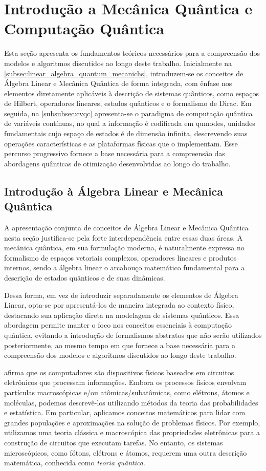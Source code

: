 \section{Introdução a Mecânica Quântica e Computação Quântica}\label{sec:quantum_mechanics}

Esta seção apresenta os fundamentos teóricos necessários para a compreensão dos modelos e algoritmos discutidos ao longo deste trabalho. Inicialmente na \autoref{subsec:linear_algebra_quantum_mecanichs}, introduzem-se os conceitos de Álgebra Linear e Mecânica Quântica de forma integrada, com ênfase nos elementos diretamente aplicáveis à descrição de sistemas quânticos, como espaços de Hilbert, operadores lineares, estados quânticos e o formalismo de Dirac. Em seguida, na \autoref{subsubsec:cvqc} apresenta-se o paradigma de computação quântica de variáveis contínuas, no qual a informação é codificada em qumodes, unidades fundamentais cujo espaço de estados é de dimensão infinita, descrevendo suas operações características e as plataformas físicas que o implementam. Esse percurso progressivo fornece a base necessária para a compreensão das abordagens quânticas de otimização desenvolvidas ao longo do trabalho.

\subsection{Introdução à Álgebra Linear e Mecânica Quântica}\label{subsec:linear_algebra_quantum_mecanichs}

A apresentação conjunta de conceitos de Álgebra Linear e Mecânica Quântica nesta seção justifica-se pela forte interdependência entre essas duas áreas. A mecânica quântica, em sua formulação moderna, é naturalmente expressa no formalismo de espaços vetoriais complexos, operadores lineares e produtos internos, sendo a álgebra linear o arcabouço matemático fundamental para a descrição de estados quânticos e de suas dinâmicas.

Dessa forma, em vez de introduzir separadamente os elementos de Álgebra Linear, opta-se por apresentá-los de maneira integrada ao contexto físico, destacando sua aplicação direta na modelagem de sistemas quânticos. Essa abordagem permite manter o foco nos conceitos essenciais à computação quântica, evitando a introdução de formalismos abstratos que não serão utilizados posteriormente, ao mesmo tempo em que fornece a base necessária para a compreensão dos modelos e algoritmos discutidos ao longo deste trabalho.

\textcite{Schuld2021} afirma que os computadores são dispositivos físicos baseados em circuitos eletrônicos que processam informações. Embora os processos físicos envolvam partículas macroscópicas e/ou atômicas/subatômicas, como elétrons, átomos e moléculas, podemos descrevê-los utilizando métodos da teoria das probabilidades e estatística. Em particular, aplicamos conceitos matemáticos para lidar com grandes populações e aproximações na solução de problemas físicos. Por exemplo, utilizamos uma teoria clássica e macroscópica das propriedades eletrônicas para a construção de circuitos que executam tarefas. No entanto, os sistemas microscópicos, como fótons, elétrons e átomos, requerem uma outra descrição matemática, conhecida como \textit{teoria quântica}.

